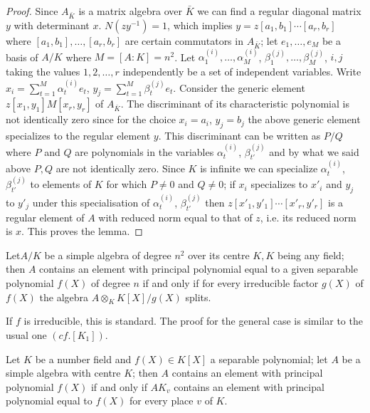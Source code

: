\begin{proof}
Since $A_{\bar{K}}$ is a matrix algebra over $\bar{K}$ we can find a
regular diagonal matrix $y$ with determinant $x$. $N(zy^{-1})=1$,
which implies $y=z[a_1, b_1] \cdots [a_r, b_r]$ where $[a_1,
b_1],\ldots,[a_r,b_r]$ are certain commutators in $A_{\bar{K}}$; let
$e_1, \ldots , e_M$ be a basis of $A/K$ where $M=[A:K]=n^2$. Let
$\alpha_1^{(i)}, \ldots , \alpha^{(i)}_M$, $\beta^{(j)}_1, \ldots ,
\beta^{(j)}_M$, $i,j$ taking the values $1,2, \ldots ,r$ independently
be a set of independent variables. Write $x_i= \sum\limits_{t=1}^M
\alpha^{(i)}_t e_t$, $y_j= \sum\limits_{t=1}^M \beta^{(j)}_t
e_t$. Consider the generic element $z[x_1, y_1]M[x_r, y_r]$ of
$A_{\bar{K}}$. The discriminant of its characteristic polynomial is
not identically zero since for the choice $x_i=a_i$, $y_j=b_j$ the above
generic element specializes to the regular element $y$. This
discriminant can be written as $P/Q$ where $P$ and $Q$ are polynomials
in the variables $\alpha^{(i)}_t$, $\beta^{(j)}_{t'}$ and by what we
said above $P,Q$ are not identically zero. Since $K$ is infinite we
can specialize $\alpha^{(i)}_t$, $\beta^{(j)}_{t'}$ to elements of $K$
for which $P \neq 0$ and $Q \neq 0$; if $x_i$  specializes to $x'_i$
and $y_j$ to $y'_j$ under this specialisation of $\alpha^{(i)}_t$,
$\beta^{(j)}_{t'}$ then $z[x'_1, y'_1] \cdots [x'_r, y'_r]$ is a
regular element of $A$ with reduced norm equal to that of $z$, i.e. its
reduced norm is $x$. This proves the lemma. 
\end{proof}


\begin{lemb}\label{chap5:lemb} 
Let\pageoriginale $A/K$ be a simple algebra of degree $n^2$ over its 
centre $K,K$ 
being any field; then $A$ contains an element with principal
polynomial equal to a given separable polynomial $f(X)$ of degree $n$
if and only if for every irreducible factor $g(X)$ of $f(X)$ the
algebra $A\otimes_K K[X]/g(X)$ splits.  
\end{lemb}

If $f$ is irreducible, this is standard. The proof for the general
case is similar to the usual one $(cf. [K_1])$.  

\begin{lemb}\label{chap5:lemc} 
Let $K$ be a number field and $f(X)\in K[X]$ a separable
polynomial; let $A$ be a simple algebra with centre $K$; then $A$
contains an element with principal polynomial $f(X)$ if and only if
$AK_v$ contains an element with principal polynomial equal to
$f(X)$ for every place $v$ of $K$. 
 \end{lemb}
  
